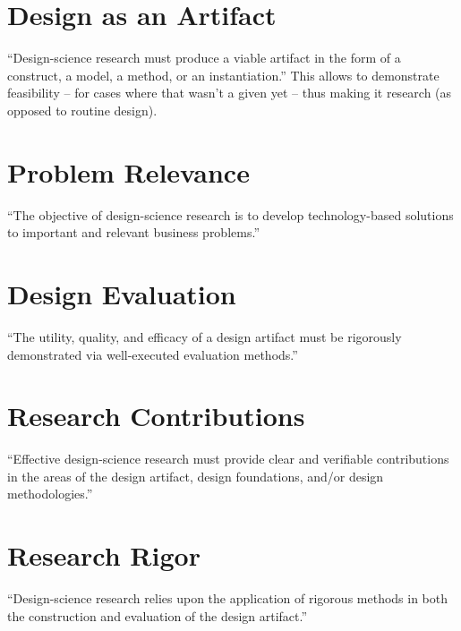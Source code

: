 
\section{Design as an Artifact}
``Design-science research must produce a viable artifact in the form of a construct, a model, a method, or an instantiation.'' This allows to demonstrate feasibility -- for cases where that wasn't a given yet -- thus making it research (as opposed to routine design).


\section{Problem Relevance}
``The objective of design-science research is to develop technology-based solutions to important and relevant business problems.''


\section{Design Evaluation}
``The utility, quality, and efficacy of a design artifact must be rigorously demonstrated via well-executed evaluation methods.''

\section{Research Contributions}
``Effective design-science research must provide clear and verifiable contributions in the areas of the design artifact, design foundations, and/or design methodologies.''

\section{Research Rigor}
``Design-science research relies upon the application of rigorous methods in both the construction and evaluation of the design artifact.''

